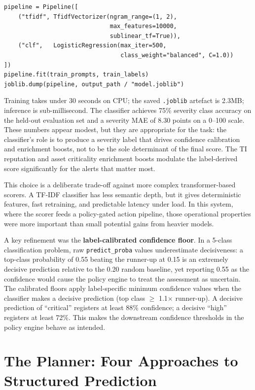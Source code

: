 \begin{verbatim}
pipeline = Pipeline([
    ("tfidf", TfidfVectorizer(ngram_range=(1, 2),
                              max_features=10000,
                              sublinear_tf=True)),
    ("clf",   LogisticRegression(max_iter=500,
                                 class_weight="balanced", C=1.0))
])
pipeline.fit(train_prompts, train_labels)
joblib.dump(pipeline, output_path / "model.joblib")
\end{verbatim}

Training takes under 30 seconds on CPU; the saved \texttt{.joblib} artefact is 2.3MB; inference is sub-millisecond. The classifier achieves 75\% severity class accuracy on the held-out evaluation set and a severity MAE of 8.30 points on a 0--100 scale. These numbers appear modest, but they are appropriate for the task: the classifier's role is to produce a severity label that drives confidence calibration and enrichment boosts, not to be the sole determinant of the final score. The TI reputation and asset criticality enrichment boosts modulate the label-derived score significantly for the alerts that matter most.

This choice is a deliberate trade-off against more complex transformer-based scorers. A
TF-IDF classifier has less semantic depth, but it gives deterministic features, fast
retraining, and predictable latency under load. In this system, where the scorer feeds a
policy-gated action pipeline, those operational properties were more important than small
potential gains from heavier models.

A key refinement was the \textbf{label-calibrated confidence floor}. In a 5-class classification problem, raw \texttt{predict\_proba} values underestimate decisiveness: a top-class probability of 0.55 beating the runner-up at 0.15 is an extremely decisive prediction relative to the 0.20 random baseline, yet reporting 0.55 as the confidence would cause the policy engine to treat the assessment as uncertain. The calibrated floors apply label-specific minimum confidence values when the classifier makes a decisive prediction (top class $\geq$ 1.1$\times$ runner-up). A decisive prediction of ``critical'' registers at least 88\% confidence; a decisive ``high'' registers at least 72\%. This makes the downstream confidence thresholds in the policy engine behave as intended.

\section{The Planner: Four Approaches to Structured Prediction}
\label{sec:planner-training}

